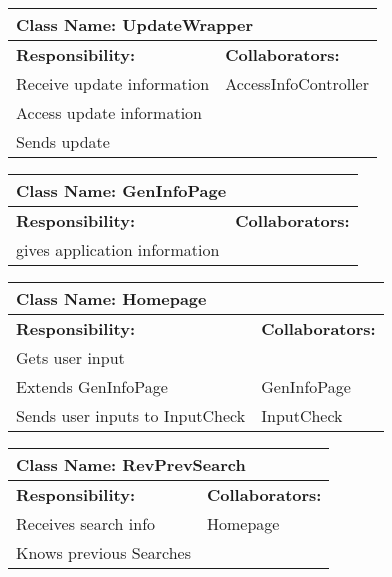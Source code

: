\documentclass[]{article}
\begin{document}
	\begin{table}[ht]
		\centering
		\begin{tabular}{|p{5cm}|p{5cm}|}
			\hline 
			\multicolumn{2}{|l|}{\textbf{Class Name: UpdateWrapper}} \\
			\hline
			\textbf{Responsibility:} & \textbf{Collaborators:} \\
			\hline
			Receive update information  & AccessInfoController\\
			\hline
			Access update information & \\
			\hline
			Sends update & \\
			\hline
		\end{tabular}
	\end{table}	

\begin{table}[ht]
		\centering
		\begin{tabular}{|p{5cm}|p{5cm}|}
			\hline 
			\multicolumn{2}{|l|}{\textbf{Class Name: GenInfoPage}} \\
			\hline
			\textbf{Responsibility:} & \textbf{Collaborators:} \\
			\hline
			gives application information &  \\
			\hline
		\end{tabular}
	\end{table}	
	
\begin{table}[ht]
		\centering
		\begin{tabular}{|p{5cm}|p{5cm}|}
			\hline 
			\multicolumn{2}{|l|}{\textbf{Class Name: Homepage}} \\
			\hline
			\textbf{Responsibility:} & \textbf{Collaborators:} \\
			\hline
			Gets user input  & \\
			\hline
			Extends GenInfoPage & GenInfoPage\\
			\hline
			Sends user inputs to InputCheck & InputCheck\\
			\hline
		\end{tabular}
	\end{table}	

\begin{table}[ht]
		\centering
		\begin{tabular}{|p{5cm}|p{5cm}|}
			\hline 
			\multicolumn{2}{|l|}{\textbf{Class Name: RevPrevSearch}} \\
			\hline
			\textbf{Responsibility:} & \textbf{Collaborators:} \\
			\hline
			Receives search info & Homepage\\
			\hline
			Knows previous Searches & \\
			\hline
		\end{tabular}
	\end{table}	
\end{document}
